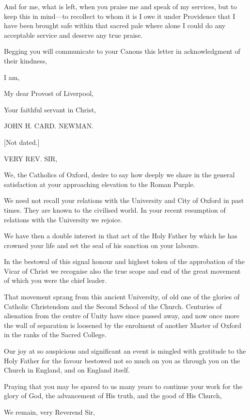 And for me, what is left, when you praise me and speak of my
services, but to keep this in mind—to recollect to whom it is I owe
it under Providence that I have been brought safe within that sacred
pale where alone I could do any acceptable service and deserve any
true praise.

Begging you will communicate to your Canons this letter in
acknowledgment of their kindness,

I am,

My dear Provost of Liverpool,

Your faithful servant in Christ,

JOHN H. CARD. NEWMAN.


[Not dated.]

VERY REV. SIR,

We, the Catholics of Oxford, desire to say how deeply we share in the
general satisfaction at your approaching elevation to the Roman
Purple.

We need not recall your relations with the University and City of
Oxford in past times. They are known to the civilised world. In your
recent resumption of relations with the University we rejoice.

We have then a double interest in that act of the Holy Father by
which he has crowned your life and set the seal of his sanction on
your labours.

In the bestowal of this signal honour and highest token of the
approbation of the Vicar of Christ we recognise also the true scope
and end of the great movement of which you were the chief leader.

That movement sprang from this ancient University, of old one of
the glories of Catholic Christendom and the Second School of the
Church. Centuries of alienation from the centre of Unity have since
passed away, and now once more the wall of separation is loosened by
the enrolment of another Master of Oxford in the ranks of the Sacred
College.

Our joy at so auspicious and significant an event is mingled with
gratitude to the Holy Father for the favour bestowed not so much on
you as through you on the Church in England, and on England
itself.

Praying that you may be spared to us many years to continue your
work for the glory of God, the advancement of His truth, and the good
of His Church,

We remain, very Reverend Sir,

